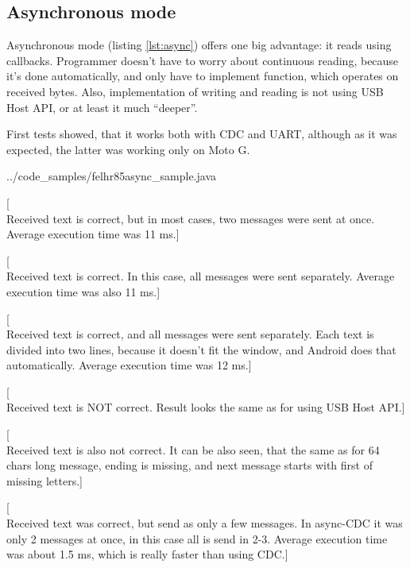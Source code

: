 \subsection{Asynchronous mode}
Asynchronous mode (listing \ref{lst:async}) offers one big advantage: it reads
using callbacks.
Programmer doesn't have to worry about continuous reading, because it's done
automatically, and only have to implement function, which operates on received
bytes.
Also, implementation of writing and reading is not using USB Host API, or at
least it much ``deeper''.

First tests showed, that it works both with CDC and UART, although as it was
expected, the latter was working only on Moto G.


{../code_samples/felhr85async_sample.java}

[\\Received text is correct, but in most cases, two messages were sent at once.
Average execution time was 11 ms.]

[\\Received text is correct. 
In this case, all messages were sent separately.
Average execution time was also 11 ms.]


[\\Received text is correct, and all messages were sent separately.
Each text is divided into two lines, because it doesn't fit the window, and
Android does that automatically.
Average execution time was 12 ms.]

[\\Received text is  NOT correct.
Result looks the same as for using USB Host API.]

[\\Received text is also not correct.
It can be also seen, that the same as for 64 chars long message, ending is
missing, and next message starts with first of missing letters.]

[\\Received text was correct, but send as only a few messages. 
In async-CDC it was only 2 messages at once, in this case all is send in 2-3.
Average execution time was about 1.5 ms, which is really faster than using CDC.]

